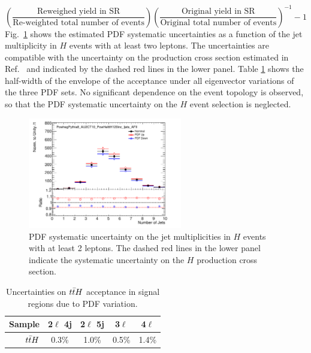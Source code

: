 \begin{equation} \label{equation:systematics_PDFunc}
\left(\frac{\textrm{Reweighed yield in SR}}{\textrm{Re-weighted total number of events}}\right)\left(\frac{\textrm{Original yield in SR}}{\textrm{Original total number of events}}\right)^{-1}-1
\end{equation}
Fig.~\ref{figure:systematics_theosystPDF} shows the estimated PDF systematic uncertainties as a function of the jet multiplicity in \ttbar$H$ events with at least two leptons. The uncertainties are compatible with the uncertainty on the production cross section estimated in Ref.~\cite{Heinemeyer:2013tqa} and indicated by the dashed red lines in the lower panel. 
Table \ref{table:systematics_pdfaccttH} shows the half-width of the envelope of the acceptance under all eigenvector variations of the three PDF sets.
No significant dependence on the event topology is observed, so that the PDF systematic uncertainty on the \ttbar$H$ event selection is neglected.
\begin{figure}[htbp]
\begin{center}
\includegraphics[width=0.6\textwidth]{figs/tth/plot_PowhegPythia8_AU2CT10_PowHelttH120inc_ljets_AFII_njets_all_njets_all}
\caption{PDF systematic uncertainty on the jet multiplicities in \ttbar$H$ events with at least 2 leptons. The dashed red lines in the lower panel indicate the systematic uncertainty on the \ttbar$H$ production cross section.}
\label{figure:systematics_theosystPDF}
\end{center}
\end{figure}

\begin{table}
\begin{center}
\caption{\label{table:systematics_pdfaccttH}Uncertainties on $t\bar{t} H$ acceptance in signal
  regions due to PDF variation.}
\begin{tabular}{r|c|c|c|c}
Sample & 2$\ell$ 4j & 2$\ell$ 5j & 3$\ell$ & 4$\ell$\\
\hline
$t\bar{t} H$ & 0.3\% & 1.0\% & 0.5\% & 1.4\%\\
\end{tabular}
\end{center}
\end{table}



